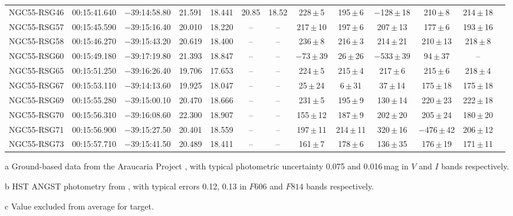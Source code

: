 \begin{table}
\begin{threeparttable}
\begin{tabular}{lcccccccccccl}
NGC55-RSG46 & 00:15:41.640 & $-$39:14:58.80& 21.591 & 18.441 &20.85 & 18.52 &   228\,$\pm$\,5  &  195\,$\pm$\,6   &  $-$128\,$\pm$\,18\tnote{c} &   210\,$\pm$\,8     & 214\,$\pm$\,18 & \\
NGC55-RSG57 & 00:15:45.590 & $-$39:15:16.40& 20.010 & 18.220 & --   & --    &   217\,$\pm$\,10 &  197\,$\pm$\,6   &     207\,$\pm$\,13 &   177\,$\pm$\,6              & 193\,$\pm$\,16 & \\
NGC55-RSG58 & 00:15:46.270 & $-$39:15:43.20& 20.619 & 18.400 & --   & --    &   236\,$\pm$\,8  &  216\,$\pm$\,3   &     214\,$\pm$\,21 &   210\,$\pm$\,13             & 218\,$\pm$\,8  & \\
NGC55-RSG60 & 00:15:49.180 & $-$39:17:19.80& 21.393 & 18.847 & --   & --    & $-$73\,$\pm$\,39 &   26\,$\pm$\,26  &  $-$533\,$\pm$\,39 &    94\,$\pm$\,37             & --             & \\
NGC55-RSG65 & 00:15:51.250 & $-$39:16:26.40& 19.706 & 17.653 & --   & --    &   224\,$\pm$\,5  &  215\,$\pm$\,4   &     217\,$\pm$\,6  &   215\,$\pm$\,6              & 218\,$\pm$\,4  & \\
NGC55-RSG67 & 00:15:53.110 & $-$39:14:13.60& 19.925 & 18.047 & --   & --    &25\,$\pm$\,24\tnote{c} & 6\,$\pm$\,31\tnote{c}&37\,$\pm$\,14\tnote{c} &175\,$\pm$\,18    & 175\,$\pm$\,18 & \\
NGC55-RSG69 & 00:15:55.280 & $-$39:15:00.10& 20.470 & 18.666 & --   & --    &   231\,$\pm$\,5  &  195\,$\pm$\,9   &130\,$\pm$\,14\tnote{c}&220\,$\pm$\,23             & 222\,$\pm$\,18 & \\
NGC55-RSG70 & 00:15:56.310 & $-$39:16:08.60& 22.300 & 18.907 & --   & --    &   155\,$\pm$\,12 &  187\,$\pm$\,9   &     202\,$\pm$\,20 &   205\,$\pm$\,24             & 180\,$\pm$\,20 & \\
NGC55-RSG71 & 00:15:56.900 & $-$39:15:27.50& 20.401 & 18.559 & --   & --    &   197\,$\pm$\,11 &  214\,$\pm$\,11  &320\,$\pm$\,16\tnote{c}&$-$476\,$\pm$\,42\tnote{c} & 206\,$\pm$\,12 & \\
NGC55-RSG73 & 00:15:57.710 & $-$39:15:41.50& 20.489 & 18.411 & --   & --    &   161\,$\pm$\,7  &  178\,$\pm$\,6   &     136\,$\pm$\,35 &   176\,$\pm$\,19             & 171\,$\pm$\,11 & \\

\hline
\end{tabular}
\begin{tablenotes}
  \item [a] Ground-based data from the Araucaria Project
  \protect\cite{2006AJ....132.2556P}, with typical photometric uncertainty 0.075 and 0.016\,mag in $V$ and $I$ bands respectively.
  \item [b] HST ANGST photometry from
  \protect\cite{2009ApJS..183...67D}, with typical errors 0.12, 0.13 in $F606$ and $F814$ bands respectively.
  \item [c] Value excluded from average for target.
\end{tablenotes}
\end{threeparttable}
\end{table}

